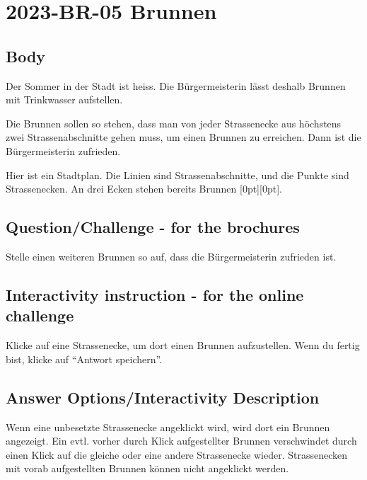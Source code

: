 \documentclass[a4paper,11pt]{report}
\newcommand{\taskGraphicsFolder}{..}
\begin{document}
\section*{\centering{} 2023-BR-05 Brunnen}


\subsection*{Body}

Der Sommer in der Stadt ist heiss.  Die Bürgermeisterin lässt deshalb Brunnen mit Trinkwasser aufstellen.

Die Brunnen sollen so stehen, dass man von jeder Strassenecke aus höchstens zwei Strassenabschnitte gehen muss, um einen Brunnen zu erreichen. Dann ist die Bürgermeisterin zufrieden.

Hier ist ein Stadtplan. Die Linien sind Strassenabschnitte, und die Punkte sind Strassenecken.
An drei Ecken stehen bereits Brunnen \raisebox{-0.5ex}[0pt][0pt]{}.

{\centering%
\par}

{\em


\subsection*{Question/Challenge - for the brochures}

Stelle einen weiteren Brunnen so auf, dass die Bürgermeisterin zufrieden ist.

}


\subsection*{Interactivity instruction - for the online challenge}

Klicke auf eine Strassenecke, um dort einen Brunnen aufzustellen. Wenn du fertig bist, klicke auf \enquote{Antwort speichern}.

\begingroup
\renewcommand{\arraystretch}{1.5}
\subsection*{Answer Options/Interactivity Description}

Wenn eine unbesetzte Strassenecke angeklickt wird, wird dort ein Brunnen angezeigt. Ein evtl. vorher durch Klick aufgestellter Brunnen verschwindet durch einen Klick auf die gleiche oder eine andere Strassenecke wieder. Strassenecken mit vorab aufgestellten Brunnen können nicht angeklickt werden.
\end{document}
